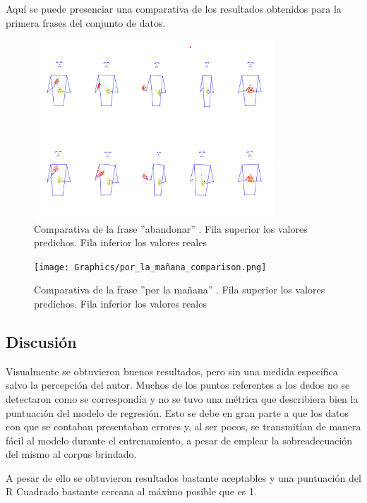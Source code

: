 Aquí se puede presenciar una comparativa de los resultados obtenidos para la primera frases del conjunto de datos.

\begin{figure}[ht!]
    \centering
    \includegraphics[width=0.8\textwidth]{Graphics/abandonar_comparison.png}
    \caption{Comparativa de la frase ''abandonar'' . Fila superior los valores predichos. Fila inferior los valores reales}
    \label{fig:abandonar_comparison}
\end{figure}

\begin{figure}[ht!]
    \centering
    \texttt{[image: Graphics/por\_la\_mañana\_comparison.png]}
    \caption{Comparativa de la frase ''por la mañana'' . Fila superior los valores predichos. Fila inferior los valores reales}
    \label{fig:mannana_comparison}
\end{figure}

\subsection{Discusión}
Visualmente se obtuvieron buenos resultados, pero sin una medida específica salvo la percepción del autor.
Muchos de los puntos referentes a los dedos no se detectaron como se correspondía y no se tuvo una métrica que describiera bien la puntuación del modelo de regresión.
 Esto se debe en gran parte a que los datos con que se contaban presentaban errores y, al ser pocos, se transmitían de manera fácil al modelo durante el entrenamiento, a pesar de emplear la sobreadecuación del mismo al corpus brindado.

A pesar de ello se obtuvieron resultados bastante aceptables y una puntuación del R Cuadrado bastante cercana al máximo posible que es 1.